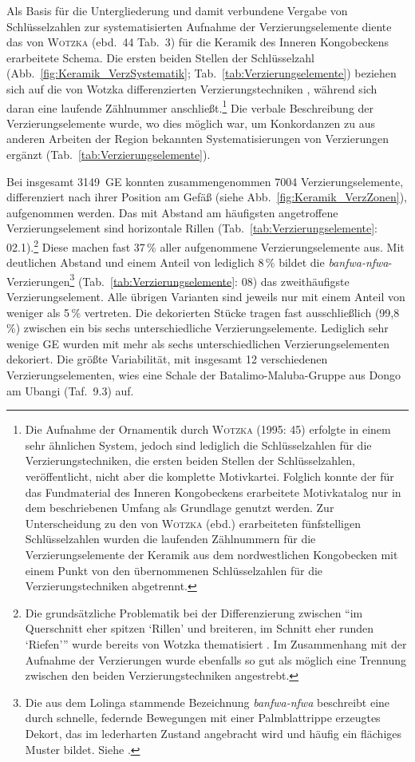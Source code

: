 Als Basis für die Untergliederung und damit verbundene Vergabe von Schlüsselzahlen zur systematisierten Aufnahme der Verzierungselemente diente das von \textsc{Wotzka} (ebd.~44 Tab.~3) für die Keramik des Inneren Kongobeckens erarbeitete Schema. Die ersten beiden Stellen der Schlüsselzahl (Abb.~\ref{fig:Keramik_VerzSystematik}; Tab.~\ref{tab:Verzierungselemente}) beziehen sich auf die von Wotzka differenzierten Verzierungstechniken \parencite[44 Tab.~3]{Wotzka.1995}, während sich daran eine laufende Zählnummer anschließt.\footnote{Die Aufnahme der Ornamentik durch \textsc{Wotzka} (1995: 45) erfolgte in einem sehr ähnlichen System, jedoch sind lediglich die Schlüsselzahlen für die Verzierungstechniken, die ersten beiden Stellen der Schlüsselzahlen, veröffentlicht, nicht aber die komplette Motivkartei. Folglich konnte der für das Fundmaterial des Inneren Kongobeckens erarbeitete Motivkatalog nur in dem beschriebenen Umfang als Grundlage genutzt werden. Zur Unterscheidung zu den von \textsc{Wotzka} (ebd.) erarbeiteten fünfstelligen Schlüsselzahlen wurden die laufenden Zählnummern für die Verzierungselemente der Keramik aus dem nordwestlichen Kongobecken mit einem Punkt von den übernommenen Schlüsselzahlen für die Verzierungstechniken abgetrennt.} Die verbale Beschreibung der Verzierungselemente wurde, wo dies möglich war, um Konkordanzen zu aus anderen Arbeiten der Region bekannten Systematisierungen von Verzierungen ergänzt (Tab.~\ref{tab:Verzierungselemente}).

Bei insgesamt 3149~GE konnten zusammengenommen 7004 Verzierungselemente, differenziert nach ihrer Position am Gefäß (siehe Abb.~\ref{fig:Keramik_VerzZonen}), aufgenommen werden. Das mit Abstand am häufigsten angetroffene Verzierungselement sind horizontale Rillen (Tab.~\ref{tab:Verzierungselemente}: 02.1).\footnote{Die grundsätzliche Problematik bei der Differenzierung zwischen \enquote{im Querschnitt eher spitzen \enquote{Rillen} und breiteren, im Schnitt eher runden \enquote{Riefen}} wurde bereits von Wotzka thematisiert \parencite[44 Anm.~8]{Wotzka.1995}. Im Zusammenhang mit der Aufnahme der Verzierungen wurde ebenfalls so gut als möglich eine Trennung zwischen den beiden Verzierungstechniken angestrebt.} Diese machen fast 37\,\% aller aufgenommene Verzierungselemente aus. Mit deutlichen Abstand und einem Anteil von lediglich 8\,\% bildet die \textit{banfwa-nfwa}-Verzierungen\footnote{Die aus dem Lolinga stammende Bezeichnung \textit{banfwa-nfwa} beschreibt eine durch schnelle, federnde Bewegungen mit einer Palmblattrippe erzeugtes Dekort, das im lederharten Zustand angebracht wird und häufig ein flächiges Muster bildet. Siehe \textcites[386 Anm.~5]{Eggert.1980b}[399 Anm.~19]{Eggert.1980c}[38 Anm.~2, 109--112]{Wotzka.1995}.} (Tab.~\ref{tab:Verzierungselemente}: 08) das zweithäufigste Verzierungselement. Alle übrigen Varianten sind jeweils nur mit einem Anteil von weniger als 5\,\% vertreten. Die dekorierten Stücke tragen fast ausschließlich (99,8\,\%) zwischen ein bis sechs unterschiedliche Verzierungselemente. Lediglich sehr wenige GE wurden mit mehr als sechs unterschiedlichen Verzierungselementen dekoriert. Die größte Variabilität, mit insgesamt 12 verschiedenen Verzierungselementen, wies eine Schale der Batalimo-Maluba-Gruppe aus Dongo am Ubangi (Taf.~9.3) auf.

